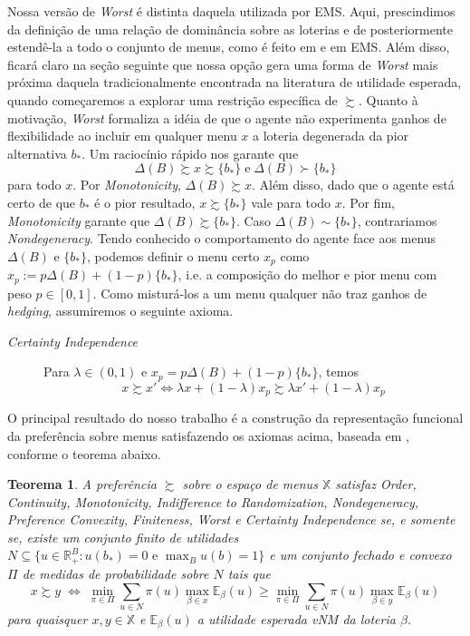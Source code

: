 \documentclass[11pt, a4paper]{article}
\theoremstyle{nonumberplain}
\theoremstyle{plain}
\newtheorem{theorem}{Teorema}
\theoremstyle{plain}
\theoremstyle{plain}
\theoremstyle{nonumberplain}
\begin{document}
Nossa versão de \emph{Worst} é distinta daquela utilizada por EMS. Aqui, prescindimos da definição de uma relação de dominância sobre as loterias e de posteriormente estendê-la a todo o conjunto de menus, como é feito em \cite{Kreps1979} e em EMS. Além disso, ficará claro na seção seguinte que nossa opção gera uma forma de \emph{Worst} mais próxima daquela tradicionalmente encontrada na literatura de utilidade esperada, quando começaremos a explorar uma restrição específica de $\succsim$. Quanto à motivação, \emph{Worst} formaliza a idéia de que o agente não experimenta ganhos de flexibilidade ao incluir em qualquer menu $x$ a loteria degenerada da pior alternativa $b_*$. Um raciocínio rápido nos garante que $$\Delta(B)\succsim x\succsim \{b_*\} \; \text{e} \; \Delta(B)\succ \{b_*\}$$ para todo $x$. Por \textit{Monotonicity}, $\Delta(B) \succsim x$. Além disso, dado que o agente está certo de que $b_*$ é o pior resultado, $x\succsim \{b_*\}$ vale para todo $x$. Por fim, \textit{Monotonicity} garante que $\Delta(B)\succsim \{b_*\}$. Caso $\Delta(B) \sim \{b_*\}$, contrariamos \textit{Nondegeneracy}.
Tendo conhecido o comportamento do agente face aos menus $\Delta(B)$ e $\{b_*\}$, podemos definir o menu certo $x_p$ como $x_p:=p\Delta(B)+(1-p)\{b_*\}$, i.e. a composição do melhor e pior menu com peso $p\in [0,1]$. Como misturá-los a um menu qualquer não traz ganhos de \emph{hedging}, assumiremos o seguinte axioma.
\begin{description}
\item [\textit{Certainty Independence}] Para $\lambda\in (0,1)$ e $x_p=p\Delta(B)+(1-p)\{b_*\}$, temos $$x\succsim x' \Leftrightarrow \lambda x +(1-\lambda)x_p\succsim \lambda x' + (1-\lambda)x_p$$
\end{description}
O principal resultado do nosso trabalho é a construção da representação funcional da preferência sobre menus satisfazendo os axiomas acima, baseada em \cite{Epstein2007}, conforme o teorema abaixo.
\begin{theorem} \label{nossoteorema} A preferência $\succsim$ sobre o espaço de menus $\mathbb{X}$ satisfaz \emph{Order}, \emph{Continuity}, \emph{Monotonicity}, \emph{Indifference to Randomization}, \emph{Nondegeneracy}, \emph{Preference Convexity}, \emph{Finiteness}, \emph{Worst} e \emph{Certainty Independence} se, e somente se, existe um conjunto finito de utilidades $N\subseteq \{u \in \mathbb{R}^B_+:u(b_*)=0\text { e }\max_{B}u(b)=1\}$ e um conjunto fechado e convexo $\Pi$ de medidas de probabilidade sobre $N$ tais que
\[x \succsim y \;\Leftrightarrow\; \min_{\pi\in\Pi}\sum_{u\in N} \pi(u)\max_{\beta\in x}\mathbb{E}_\beta(u)\geq \min_{\pi\in\Pi}\sum_{u\in N} \pi(u)\max_{\beta\in y}\mathbb{E}_\beta(u)\]
para quaisquer $x,y\in\mathbb{X}$ e $\mathbb{E}_\beta(u)$ a utilidade esperada vNM
da loteria $\beta$. \end{theorem}
\end{document}
